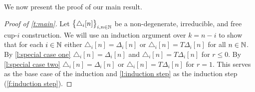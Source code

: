 We now present the proof of our main result.

\begin{proof}[Proof of \cref{t:main}]
	Let $\big\{ \triangle_i [n] \big\}_{i,n\in\mathbb{N}}$ be a non-degenerate, irreducible, and free \mbox{cup-$i$} construction.
	We will use an induction argument over $k = n-i$ to show that for each $i \in \mathbb{N}$ either $\triangle_i [n] = \Delta_i [n]$ or
	$\triangle_i [n] = T \Delta_i [n]$ for all $n \in \mathbb{N}$.
	By \cref{l:special case one} $\triangle_i [n] = \Delta_i [n]$ and $\triangle_i [n] = T \Delta_i [n]$ for $r \leq 0$.
	By \cref{l:special case two} $\triangle_i [n] = \Delta_i [n]$ or $\triangle_i [n] = T \Delta_i [n]$ for $r = 1$.
	This serves as the base case of the induction and \cref{l:induction step} as the induction step (\cref{f:induction step}).
\end{proof}